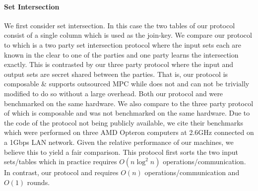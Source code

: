 %



\paragraph{Set Intersection} We first consider set intersection. In this case the two tables of our protocol consist of a single column which is used as the join-key. We compare our protocol to \cite{CCS:KKRT16} which is a two party set intersection protocol where the input sets each are known in the clear to one of the parties and one party learns the intersection exactly. This is contrasted by our three party protocol where the input and output sets are secret shared between the parties. That is, our protocol is composable \& supports outsourced MPC while \cite{CCS:KKRT16} does not and can not be trivially modified to do so without a large overhead. Both our protocol and \cite{CCS:KKRT16} were benchmarked on the same hardware. We also compare to the three party protocol of \cite{ASIACCS:BlaAgu12} which is composable and was not benchmarked on the same hardware. Due to the code of the \cite{ASIACCS:BlaAgu12} protocol not being publicly available, we cite their benchmarks which were performed on three AMD Opteron computers at 2.6GHz connected on a 1Gbps LAN network. Given the relative performance of our machines, we believe this to yield a fair comparison. This protocol first sorts the two input sets/tables which in practice requires $O(n\log^2 n)$ operations/communication\cite{ASIACCS:BlaAgu12}. In contrast, our protocol and \cite{CCS:KKRT16} requires $O(n)$ operations/communication and $O(1)$ rounds. 


